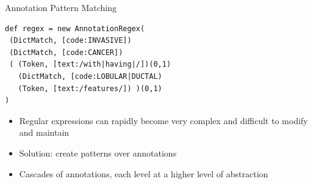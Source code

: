\documentclass[10pt]{beamer}
\begin{document}
\begin{frame}[fragile]{Annotation Pattern Matching}

\begin{lstlisting}[frame=single]
def regex = new AnnotationRegex(
 (DictMatch, [code:INVASIVE])
 (DictMatch, [code:CANCER])
 ( (Token, [text:/with|having|/])(0,1)
   (DictMatch, [code:LOBULAR|DUCTAL)
   (Token, [text:/features/]) )(0,1)
)
\end{lstlisting}

\begin{itemize}
	\item Regular expressions can rapidly become very complex and difficult to modify and maintain
	\item Solution: create \alert{patterns} over annotations
	\item Cascades of annotations, each level at a higher level of abstraction
\end{itemize}

\end{frame}
\end{document}
